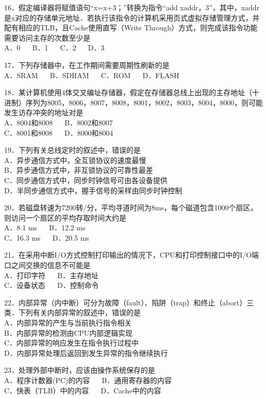 16．假定编译器将赋值语句“x=x+3；”转换为指令“add xaddr，3”，其中，xaddr是x对应的存储单元地址．若执行该指令的计算机采用页式虚拟存储管理方式，并配有相应的TLB，且Cache使用直写（Write Through）方式，则完成该指令功能需要访问主存的次数至少是 \\
A．0 $\quad$ B．1 $\quad$ C．2 $\quad$ D．3

17．下列存储器中，在工作期间需要周期性刷新的是 \\
A．SRAM $\quad$ B．SDRAM $\quad$ C．ROM $\quad$ D．FLASH

18．某计算机使用4体交叉编址存储器，假定在存储器总线上出现的主存地址（十进制）序列为8005，8006，8007，8008，8001，8002，8003，8004，8000，则可能发生访存冲突的地址对是 \\
A．8004和8008 $\quad$ B．8002和8007 \\
C．8001和8008 $\quad$ D．8000和8004

19．下列有关总线定时的叙述中，错误的是 \\
A．异步通信方式中，全互锁协议的速度最慢 \\
B．异步通信方式中，非互锁协议的可靠性最差 \\
C．同步通信方式中，同步时钟信号可由各设备提供 \\
D．半同步通信方式中，握手信号的采样由同步时钟控制

20．若磁盘转速为7200转/分，平均寻道时间为8ms，每个磁道包含1000个扇区，则访问一个扇区的平均存取时间大约是 \\
A．8.1 ms $\quad$ B．12.2 ms \\
C．16.3 ms $\quad$ D．20.5 ms

21．在采用中断I/O方式控制打印输出的情况下，CPU和打印控制接口中的I/O端口之间交换的信息不可能是 \\
A．打印字符 $\quad$ B．主存地址 \\
C．设备状态 $\quad$ D．控制命令

22．内部异常（内中断）可分为故障（fault）、陷阱（trap）和终止（abort）三类．下列有关内部异常的叙述中，错误的是 \\
A．内部异常的产生与当前执行指令相关 \\
B．内部异常的检测由CPU内部逻辑实现 \\
C．内部异常的响应发生在指令执行过程中 \\
D．内部异常处理后返回到发生异常的指令继续执行

23．处理外部中断时，应该由操作系统保存的是 \\
A．程序计数器(PC)的内容 $\quad$ B．通用寄存器的内容 \\
C．快表（TLB）中的内容 $\quad$ D．Cache中的内容

